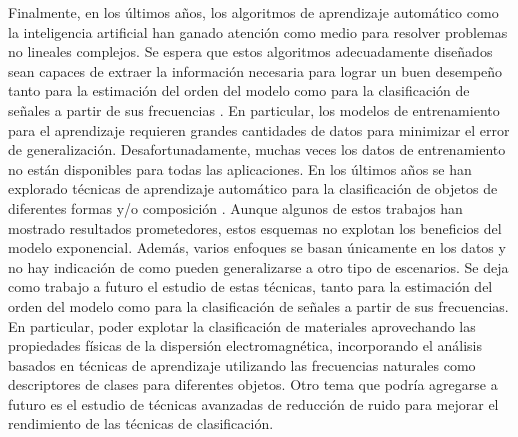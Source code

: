 
Finalmente, en los últimos años, los algoritmos de aprendizaje automático como la inteligencia artificial han ganado atención como medio para resolver problemas no lineales complejos. Se espera  que estos algoritmos adecuadamente diseñados sean capaces de extraer la información necesaria  para lograr un buen desempeño tanto para la estimación del orden del modelo como para la clasificación de señales a partir de sus frecuencias \cite{Moon2021, Mhaska2020}. En particular, los modelos de entrenamiento para el aprendizaje requieren grandes cantidades de datos para minimizar el error de generalización. Desafortunadamente, muchas veces los datos de entrenamiento no están disponibles para todas las aplicaciones. En los últimos años se han explorado técnicas de aprendizaje automático para la clasificación de objetos de diferentes formas y/o composición \cite{Agresti2019, WOOD2020, Yasmeen2023}.  Aunque algunos de estos trabajos han mostrado resultados prometedores, estos esquemas no explotan los beneficios del modelo exponencial. Además, varios enfoques se basan únicamente en los datos y no hay indicación de como pueden generalizarse a otro tipo de escenarios. Se deja como trabajo a futuro el estudio de estas técnicas, tanto para la estimación del orden del modelo como para la clasificación de señales a partir de sus frecuencias. En particular, poder explotar la clasificación de materiales aprovechando las propiedades físicas de la dispersión electromagnética, incorporando el análisis basados en técnicas de aprendizaje utilizando las frecuencias naturales como descriptores de clases para diferentes objetos. Otro tema que podría agregarse a futuro es el estudio de técnicas avanzadas de reducción de ruido para mejorar el rendimiento de las técnicas de clasificación.


